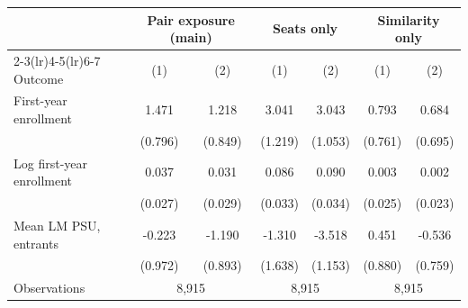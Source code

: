 \begin{tabular}{lcccccc}
\toprule
 & \multicolumn{2}{c}{Pair exposure (main)} & \multicolumn{2}{c}{Seats only} & \multicolumn{2}{c}{Similarity only} \\
\cmidrule(lr){2-3}\cmidrule(lr){4-5}\cmidrule(lr){6-7}
Outcome & (1) & (2) & (1) & (2) & (1) & (2) \\
\midrule
First-year enrollment & 1.471\sym{*} & 1.218 & 3.041\sym{**} & 3.043\sym{***} & 0.793 & 0.684 \\
 & (0.796) & (0.849) & (1.219) & (1.053) & (0.761) & (0.695) \\
Log first-year enrollment & 0.037 & 0.031 & 0.086\sym{**} & 0.090\sym{***} & 0.003 & 0.002 \\
 & (0.027) & (0.029) & (0.033) & (0.034) & (0.025) & (0.023) \\
Mean LM PSU, entrants & -0.223 & -1.190 & -1.310 & -3.518\sym{***} & 0.451 & -0.536 \\
 & (0.972) & (0.893) & (1.638) & (1.153) & (0.880) & (0.759) \\
\midrule
Observations & \multicolumn{2}{c}{ 8,915} & \multicolumn{2}{c}{ 8,915} & \multicolumn{2}{c}{ 8,915} \\
\bottomrule
\end{tabular}
